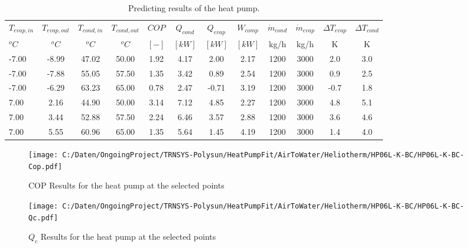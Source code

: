 \documentclass[english]{SPFShortReport}
\begin{document}
\begin{table}[!ht]
\begin{small}
\caption{Predicting results of the heat pump.}
\begin{center}
\resizebox{12cm}{!} 
{
\begin{tabular}{l | c c c c c c c c c c c } 
\hline
\hline
$T_{evap,in}$ &$T_{evap,out}$ &$T_{cond,in}$ &$T_{cond,out}$ &$COP$ &$Q_{cond}$ &$Q_{evap}$ &$W_{comp}$ &$\dot m_{cond}$ &$\dot m_{evap}$ &$\Delta T_{evap}$ &$\Delta T_{cond}$ \\ 
$^oC$ &$^oC$ &$^oC$ &$^oC$ &$[-]$ &$[kW]$ &$[kW]$ &$[kW]$ &kg/h &kg/h &K &K\\ 
\hline
-7.00 & -8.99 & 47.02 & 50.00 & 1.92 & 4.17 & 2.00 & 2.17 & 1200 & 3000 & 2.0 & 3.0\\ 
-7.00 & -7.88 & 55.05 & 57.50 & 1.35 & 3.42 & 0.89 & 2.54 & 1200 & 3000 & 0.9 & 2.5\\ 
-7.00 & -6.29 & 63.23 & 65.00 & 0.78 & 2.47 & -0.71 & 3.19 & 1200 & 3000 & -0.7 & 1.8\\ 
7.00 & 2.16 & 44.90 & 50.00 & 3.14 & 7.12 & 4.85 & 2.27 & 1200 & 3000 & 4.8 & 5.1\\ 
7.00 & 3.44 & 52.88 & 57.50 & 2.24 & 6.46 & 3.57 & 2.88 & 1200 & 3000 & 3.6 & 4.6\\ 
7.00 & 5.55 & 60.96 & 65.00 & 1.35 & 5.64 & 1.45 & 4.19 & 1200 & 3000 & 1.4 & 4.0\\ 
\hline
\hline
\end{tabular}
}
\label{ResultsTable}
\end{center}
\end{small}
\end{table}
\begin{figure}[!ht]
\begin{center}
\texttt{[image: C:/Daten/OngoingProject/TRNSYS-Polysun/HeatPumpFit/AirToWater/Heliotherm/HP06L-K-BC/HP06L-K-BC-Cop.pdf]}
\caption{COP Results for the heat pump at the selected points}
\label{COPFig}
\end{center}
\end{figure}
\begin{figure}[!ht]
\begin{center}
\texttt{[image: C:/Daten/OngoingProject/TRNSYS-Polysun/HeatPumpFit/AirToWater/Heliotherm/HP06L-K-BC/HP06L-K-BC-Qc.pdf]}
\caption{$Q_c$ Results for the heat pump at the selected points}
\label{QcFig}
\end{center}
\end{figure}
\end{document}
